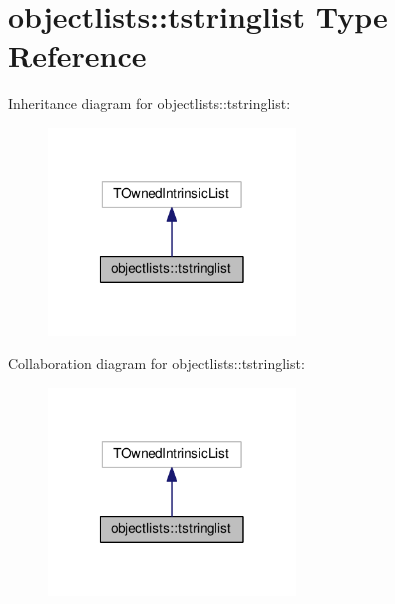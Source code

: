\hypertarget{structobjectlists_1_1tstringlist}{}\section{objectlists\+:\+:tstringlist Type Reference}
\label{structobjectlists_1_1tstringlist}


Inheritance diagram for objectlists\+:\+:tstringlist\+:
\nopagebreak
\begin{figure}[H]
\begin{center}
\leavevmode
\includegraphics[width=186pt]{structobjectlists_1_1tstringlist__inherit__graph}
\end{center}
\end{figure}


Collaboration diagram for objectlists\+:\+:tstringlist\+:
\nopagebreak
\begin{figure}[H]
\begin{center}
\leavevmode
\includegraphics[width=186pt]{structobjectlists_1_1tstringlist__coll__graph}
\end{center}
\end{figure}

